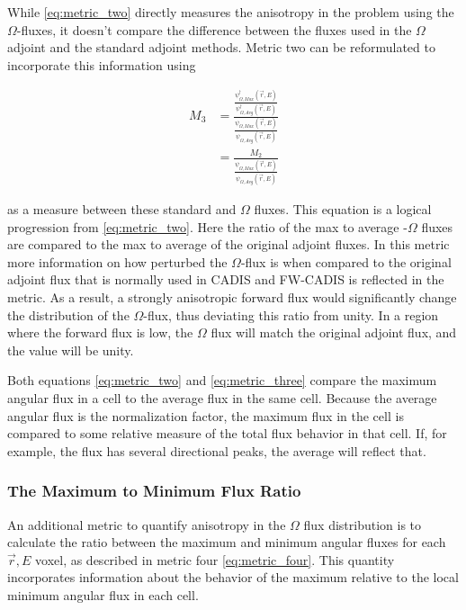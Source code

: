 While \ref{eq:metric_two} directly measures the anisotropy in the problem using
the $\Omega$-fluxes, it doesn't compare the difference between the fluxes used
in the $\Omega$ adjoint and the standard adjoint methods. Metric two can be
reformulated to incorporate this information using

\begin{equation}
  \begin{split}
    M_{3} & = \frac{\frac{\psi_{\Omega, Max}^{\dagger}(\vec {r} ,E)}{\psi_{\Omega,
                  Avg}^{\dagger}(\vec {r} ,E)}}{\frac{\psi_{\Omega,
                  Max}(\vec {r} ,E)}{\psi_{\Omega, Avg}(\vec {r} ,E)}} \\
          & = \frac{M_{2}}{\frac{\psi_{\Omega, Max}(\vec {r} ,E)}
                  {\psi_{\Omega, Avg}(\vec {r} ,E)}}
  \end{split}
  \label{eq:metric_three}
\end{equation}

as a measure between these standard and $\Omega$ fluxes.
This equation is a logical progression from \ref{eq:metric_two}. Here the ratio
of the max to average -$\Omega$ fluxes are compared to the max to average of the
original adjoint fluxes. In this metric more information on how perturbed the
$\Omega$-flux is when compared to the original adjoint flux that is normally
used in CADIS and FW-CADIS is reflected in the metric.
As a result, a strongly anisotropic
forward flux would significantly change the distribution of the $\Omega$-flux,
thus deviating this ratio from unity. In a region where the forward flux is low,
the $\Omega$ flux will match the original adjoint flux, and the value will be
unity.

Both equations \ref{eq:metric_two} and \ref{eq:metric_three} compare the maximum
angular flux in a cell to the average flux in the same cell. Because the average
angular flux is the normalization factor, the maximum flux in the cell is
compared to some relative measure of the total flux behavior in that cell. If,
for example, the flux has several directional peaks, the average will reflect
that.

\subsubsection{The Maximum to Minimum Flux Ratio}

An additional metric to quantify anisotropy in the $\Omega$ flux distribution
is to calculate the ratio between the maximum and minimum angular fluxes for
each $\vec{r}, E$ voxel, as described in metric four \ref{eq:metric_four}. This
quantity incorporates information about the
behavior of the maximum relative to the local minimum angular flux in each cell.

